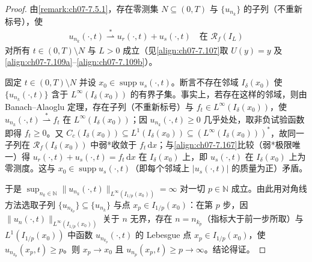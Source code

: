 \documentclass[../../main.tex]{subfiles}%
\begin{document}
\begin{proof}
由\cref{remark:ch07-7.5.1}，存在零测集 $N\subseteq(0,T)$ 与 $\{u_{n_k}\}$ 的子列（不重新标号），使
\begin{align}
u_{n_k}(\cdot,t)\stackrel{*}{\rightharpoonup}u_r(\cdot,t)+u_s(\cdot,t)\quad\text{在 }\mathscr{R}_f(I_L) \label{align:ch07-7.167}
\end{align}
对所有 $t\in(0,T)\setminus N$ 与 $L>0$ 成立（见\eqref{align:ch07-7.107}取 $U(y)=y$ 及\eqref{align:ch07-7.109a}--\eqref{align:ch07-7.109b}）。

固定 $t\in(0,T)\setminus N$ 并设 $x_0\in\operatorname{supp}u_s(\cdot,t)$。断言不存在邻域 $I_\delta(x_0)$ 使 $\{u_{n_k}(\cdot,t)\}$ 含于 $L^\infty(I_\delta(x_0))$ 的有界子集。事实上，若存在这样的邻域，则由 Banach--Alaoglu 定理，存在子列（不重新标号）与 $f_t\in L^\infty(I_\delta(x_0))$，使 $u_{n_k}(\cdot,t)\stackrel{*}{\rightharpoonup}f_t$ 在 $L^\infty(I_\delta(x_0))$；因 $u_{n_k}(\cdot,t)\geqslant0$ 几乎处处，取非负试验函数即得 $f_t\geqslant0$。又 $C_c(I_\delta(x_0))\subseteq L^1(I_\delta(x_0))\subseteq(L^\infty(I_\delta(x_0)))^*$，故同一子列在 $\mathscr{R}_f(I_\delta(x_0))$ 中弱*收敛于 $f_t\,\mathrm{d}x$；与\eqref{align:ch07-7.167}比较（弱*极限唯一）得 $u_r(\cdot,t)+u_s(\cdot,t)=f_t\,\mathrm{d}x$ 在 $I_\delta(x_0)$ 上，即 $u_s(\cdot,t)$ 在 $I_\delta(x_0)$ 上为零测度。这与 $x_0\in\operatorname{supp}u_s(\cdot,t)$（即每个邻域上 $|u_s(\cdot,t)|$ 的质量为正）矛盾。

于是 $\sup_{n_k\in\mathbb{N}}\|u_{n_k}(\cdot,t)\|_{L^\infty(I_{1/p}(x_0))}=\infty$ 对一切 $p\in\mathbb{N}$ 成立。由此用对角线方法选取子列 $\{u_{n_{k_p}}\}\subseteq\{u_{n_k}\}$ 与点 $x_p\in I_{1/p}(x_0)$：在第 $p$ 步，因 $\|u_{n}(\cdot,t)\|_{L^\infty(I_{1/p}(x_0))}$ 关于 $n$ 无界，存在 $n=n_{k_p}$（指标大于前一步所取）与 $L^1(I_{1/p}(x_0))$ 中函数 $u_{n_{k_p}}(\cdot,t)$ 的 Lebesgue 点 $x_p\in I_{1/p}(x_0)$，使 $u_{n_{k_p}}(x_p,t)\geqslant p$。则 $x_p\to x_0$ 且 $u_{n_p}(x_p,t)\geqslant p\to\infty$。结论得证。
\end{proof}
\end{document}
